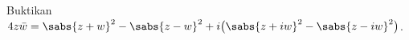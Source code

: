 
\begin{exbox}
\begin{exercise}
Buktikan \emph{}
$4 z\bar{w} =
{\sabs{z+w}}^2- {\sabs{z-w}}^2 +i \bigl( {\sabs{z+iw}}^2 - {\sabs{z-iw}}^2 \bigr)$.
\end{exercise}
\end{exbox}
